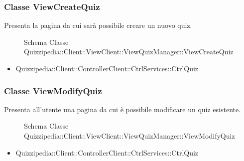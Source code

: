 \subsubsection{Classe ViewCreateQuiz}
Presenta la pagina da cui sarà possibile creare un nuovo quiz.
\begin{figure}[H]
\centering
\noindent{}
\caption[Schema Classe ViewCreateQuiz]{Schema Classe Quizzipedia::Client::ViewClient::ViewQuizManager::ViewCreateQuiz}
\end{figure}
\begin{itemize}
\item Quizzipedia::Client::ControllerClient::CtrlServices::CtrlQuiz
\end{itemize}
\subsubsection{Classe ViewModifyQuiz}
Presenta all'utente una pagina da cui è possibile modificare un quiz esistente.
\begin{figure}[H]
\centering
\noindent{}
\caption[Schema Classe ViewModifyQuiz]{Schema Classe Quizzipedia::Client::ViewClient::ViewQuizManager::ViewModifyQuiz}
\end{figure}
\begin{itemize}
\item Quizzipedia::Client::ControllerClient::CtrlServices::CtrlQuiz
\end{itemize}
